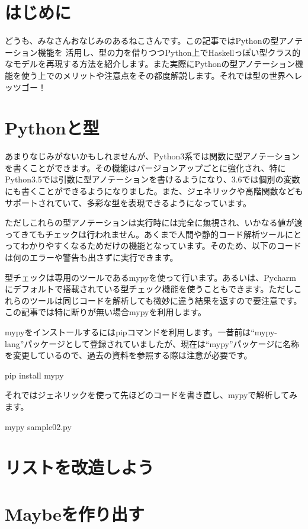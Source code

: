 \section{はじめに}
どうも、みなさんおなじみのあるねこさんです。この記事ではPythonの型アノテーション機能を
活用し、型の力を借りつつPython上でHaskellっぽい型クラス的なモデルを再現する方法を紹介します。また実際にPythonの型アノテーション機能を使う上でのメリットや注意点をその都度解説します。それでは型の世界へレッツゴー！

\section{Pythonと型}
あまりなじみがないかもしれませんが、Python3系では関数に型アノテーションを書くことができます。その機能はバージョンアップごとに強化され、特にPython3.5では引数に型アノテーションを書けるようになり、3.6では個別の変数にも書くことができるようになりました。また、ジェネリックや高階関数などもサポートされていて、多彩な型を表現できるようになっています。

ただしこれらの型アノテーションは実行時には完全に無視され、いかなる値が渡ってきてもチェックは行われません。あくまで人間や静的コード解析ツールにとってわかりやすくなるためだけの機能となっています。そのため、以下のコードは何のエラーや警告も出さずに実行できます。


型チェックは専用のツールであるmypyを使って行います。あるいは、Pycharmにデフォルトで搭載されている型チェック機能を使うこともできます。ただしこれらのツールは同じコードを解析しても微妙に違う結果を返すので要注意です。この記事では特に断りが無い場合mypyを利用します。

mypyをインストールするにはpipコマンドを利用します。一昔前は``mypy-lang''パッケージとして登録されていましたが、現在は``mypy''パッケージに名称を変更しているので、過去の資料を参照する際は注意が必要です。

\begin{bashcode}
pip install mypy
\end{bashcode}

それではジェネリックを使って先ほどのコードを書き直し、mypyで解析してみます。


\begin{bashcode}
mypy sample02.py
\end{bashcode}

\section{リストを改造しよう}

\section{Maybeを作り出す}
